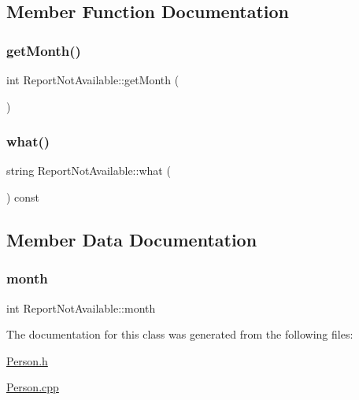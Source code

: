 \subsection{Member Function Documentation}
\mbox{\label{class_report_not_available_a64bf230892d4e34fecb8143d04b95d02}} 
\subsubsection{\texorpdfstring{get\+Month()}{getMonth()}}
{\footnotesize\ttfamily int Report\+Not\+Available\+::get\+Month (\begin{DoxyParamCaption}{ }\end{DoxyParamCaption})\hspace{0.3cm}{\ttfamily [inline]}}

\mbox{\label{class_report_not_available_a2139ebc44990ab772c6e56d0a0d71e7d}} 
\subsubsection{\texorpdfstring{what()}{what()}}
{\footnotesize\ttfamily string Report\+Not\+Available\+::what (\begin{DoxyParamCaption}{ }\end{DoxyParamCaption}) const}



\subsection{Member Data Documentation}
\mbox{\label{class_report_not_available_a11686bc53e58de31838b14e6a23ec0c6}} 
\subsubsection{\texorpdfstring{month}{month}}
{\footnotesize\ttfamily int Report\+Not\+Available\+::month}



The documentation for this class was generated from the following files\+:\begin{DoxyCompactItemize}
\item 
\mbox{\hyperlink{_person_8h}{Person.\+h}}\item 
\mbox{\hyperlink{_person_8cpp}{Person.\+cpp}}\end{DoxyCompactItemize}
